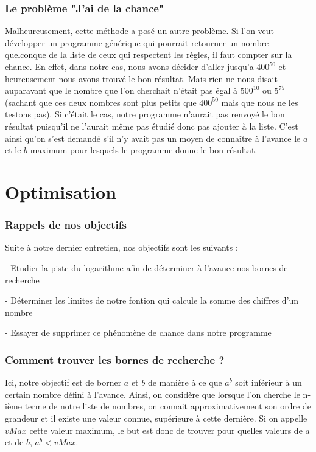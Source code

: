 \documentclass{article}
\begin{document}
\section{Le problème "J'ai de la chance"}
Malheureusement, cette méthode a posé un autre problème. Si l'on veut développer un programme générique qui pourrait retourner un nombre quelconque de la liste de ceux qui respectent les règles, il faut compter sur la chance. En effet, dans notre cas, nous avons décider d'aller jusqu'a $400^{50}$ et heureusement nous avons trouvé le bon résultat. Mais rien ne nous disait auparavant que le nombre que l'on cherchait n'était pas égal à $500^{10}$ ou $5^{75}$ (sachant que ces deux nombres sont plus petits que $400^{50}$ mais que nous ne les testons pas). Si c'était le cas, notre programme n'aurait pas renvoyé le bon résultat puisqu'il ne l'aurait même pas étudié donc pas ajouter à la liste. C'est ainsi qu'on s'est demandé s'il n'y avait pas un moyen de connaître à l'avance le $a$ et le $b$ maximum pour lesquels le programme donne le bon résultat.

\part {Optimisation}
\section {Rappels de nos objectifs}
Suite à notre dernier entretien, nos objectifs sont les suivants :

- Etudier la piste du logarithme afin de déterminer à l'avance nos bornes de recherche

- Déterminer les limites de notre fontion qui calcule la somme des chiffres d'un nombre

- Essayer de supprimer ce phénomène de chance dans notre programme

\section{Comment trouver les bornes de recherche ?}

Ici, notre objectif est de borner $a$ et $b$ de manière à ce que $a^{b}$ soit inférieur à un certain nombre défini à l'avance. Ainsi, on considère que lorsque l'on cherche le n-ième terme de notre liste de nombres, on connait approximativement son ordre de grandeur et il existe une valeur connue, supérieure à cette dernière. Si on appelle $vMax$ cette valeur maximum, le but est donc de trouver pour quelles valeurs de $a$ et de $b$, $a^{b}  < vMax$.
\end{document}

